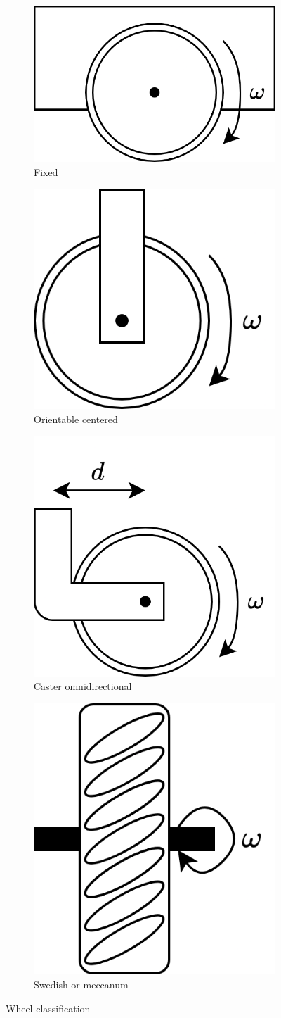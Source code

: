 \begin{figure}[H]
    \centering
    \begin{subfigure}{0.4\textwidth}
        \centering
        \includegraphics[width=0.5\linewidth]{images/fixed.png} 
        \caption{Fixed}
    \end{subfigure}
    \begin{subfigure}{0.4\textwidth}
        \centering
        \includegraphics[width=0.5\linewidth]{images/oc.png}
        \caption{Orientable centered}
    \end{subfigure}
    \begin{subfigure}{0.4\textwidth}
        \centering
        \includegraphics[width=0.5\linewidth]{images/co.png} 
        \caption{Caster omnidirectional}
    \end{subfigure}
    \begin{subfigure}{0.4\textwidth}
        \centering
        \includegraphics[width=0.3\linewidth]{images/sm.png}
        \caption{Swedish or meccanum}
    \end{subfigure}
    \caption{Wheel classification}
\end{figure}

